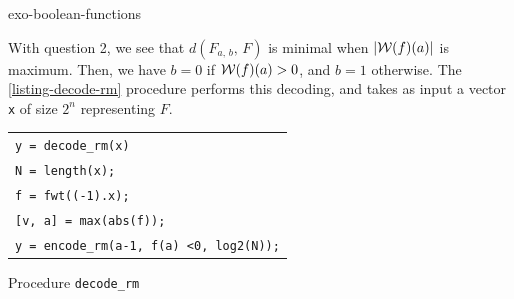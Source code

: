 \begin{correction}{exo-boolean-functions}
\begin{enumerate}
With question 2, we see that $ d (F_{a, \, b}, \, F) $ is minimal when $ | \mathcal{W} (f) (a) | $ is maximum. Then, we have $ b = 0 $ if $ \mathcal{W} (f) (a)> 0 $, and $ b = 1 $ otherwise. The \Matlab{} \ref{listing-decode-rm} procedure performs this decoding, and takes as input a vector \texttt{x} of size $ 2^n $ representing $ F $.

\begin{listing} 
\begin{footnotesize}
 {\upshape
\begin{tabular}{l} \texttt{\pfunction y = decode\_rm(x)} \\
\texttt{N = length(x);} \\
\texttt{f = fwt((-1).{\hatverb}x);} \\
\texttt{[v, a] = max(abs(f));} \\
\texttt{y = encode\_rm(a-1, f(a) <0, log2(N));} \\
\end{tabular}
}
\end{footnotesize}
\caption{Procedure \texttt{\upshape decode\_rm}}
\label{listing-decode-rm}
\end{listing}

\end{enumerate}
\end{correction}
 
